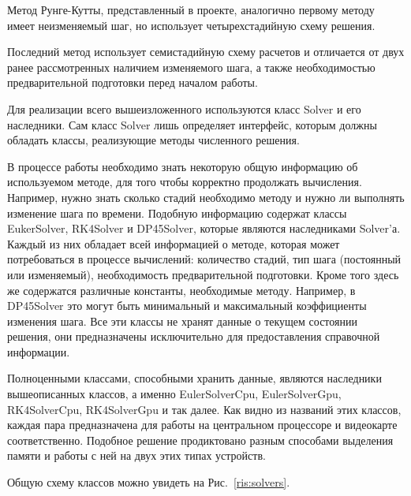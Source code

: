 \documentclass[a4paper, 14pt]{extarticle}
\theoremstyle{definition}
\begin{document}
\par Метод Рунге-Кутты, представленный в проекте, аналогично первому методу имеет неизменяемый шаг, но использует четырехстадийную схему решения.

\par Последний метод использует семистадийную схему расчетов и отличается от двух ранее рассмотренных наличием изменяемого шага, а также необходимостью предварительной подготовки перед началом работы.

\par Для реализации всего вышеизложенного используются класс Solver и его наследники. Сам класс Solver лишь определяет интерфейс, которым должны обладать классы, реализующие методы численного решения.

\par В процессе работы необходимо знать некоторую общую информацию об используемом методе, для того чтобы корректно продолжать вычисления. Например, нужно знать сколько стадий необходимо методу и нужно ли выполнять изменение шага по времени. Подобную информацию содержат классы EukerSolver, RK4Solver и DP45Solver, которые являются наследниками Solver'а. Каждый из них обладает всей информацией о методе, которая может потребоваться в процессе вычислений: количество стадий, тип шага (постоянный или изменяемый), необходимость предварительной подготовки. Кроме того здесь же содержатся различные константы, необходимые методу. Например, в DP45Solver это могут быть минимальный и максимальный коэффициенты изменения шага. Все эти классы не хранят данные о текущем состоянии решения, они предназначены исключительно для предоставления справочной информации.

\par Полноценными классами, способными хранить данные, являются наследники вышеописанных классов, а именно EulerSolverCpu, EulerSolverGpu, RK4SolverCpu, RK4SolverGpu и так далее. Как видно из названий этих классов, каждая пара предназначена для работы на центральном процессоре и видеокарте соответственно. Подобное решение продиктовано разным способами выделения памяти и работы с ней на двух этих типах устройств.

\par Общую схему классов можно увидеть на Рис.~\ref{ris:solvers}.
\end{document}
